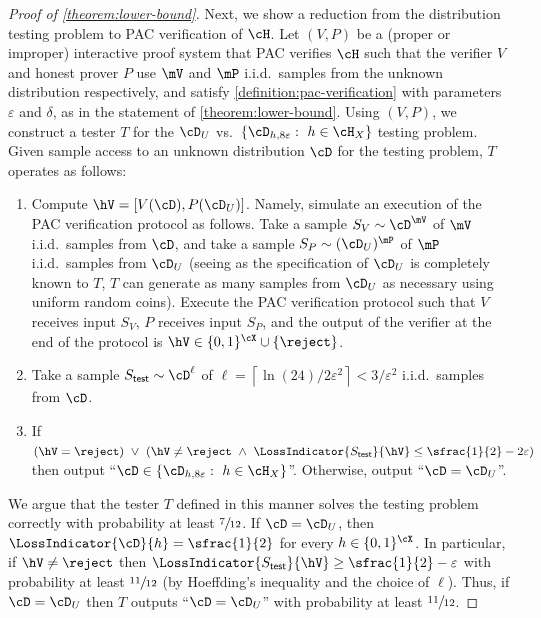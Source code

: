 \documentclass{toc}
\begin{document}
\begin{proof}[Proof of \cref{theorem:lower-bound}]
	Next, we show a reduction from the distribution testing problem to PAC verification of $\cH$. Let $(V,P)$ be a (proper or improper) interactive proof system that PAC verifies $\cH$ such that the verifier $V$ and honest prover $P$ use $\mV$ and $\mP$ i.i.d.\ samples from the unknown distribution respectively, and satisfy \cref{definition:pac-verification} with parameters $\varepsilon$ and $\delta$, as in the statement of \cref{theorem:lower-bound}.
	Using $(V,P)$, we construct a tester $T$ for the $\cD_U$ vs.\ $\{\cD_{h,8\varepsilon}: ~ h \in \cH_X\}$ testing problem. Given sample access to an unknown distribution $\cD$ for the testing problem, $T$ operates as follows:
	\begin{enumerate}
		\item{
			Compute $\hV = [V(\cD),P(\cD_U)]$. Namely, simulate an execution of the PAC verification protocol as follows. Take a sample $S_V \sim \cD^{\mV}$ of $\mV$ i.i.d.\ samples from $\cD$, and take a sample $S_P \sim (\cD_U)^{\mP}$ of $\mP$ i.i.d.\ samples from $\cD_U$ (seeing as the specification of $\cD_U$ is completely known to $T$, $T$ can generate as many samples from $\cD_U$ as necessary using uniform random coins). Execute the PAC verification protocol such that $V$ receives input $S_V$, $P$ receives input $S_P$, and the output of the verifier at the end of the protocol is $\hV \in \{0,1\}^\cX \cup \{\reject\}$.   
		}
		\item{
			Take a sample $S_{\mathsf{test}} \sim \cD^\ell$ of $\ell = \left\lceil \ln(24)/2\varepsilon^2 \right\rceil < 3/\varepsilon^2$ i.i.d.\ samples from $\cD$.
		}
		\item{
			If $(\hV = \reject)  ~ \lor ~ (\hV \neq \reject ~ \land ~ \LossIndicator{S_{\mathsf{test}}}{\hV} \leq \sfrac{1}{2}-2\varepsilon)$ then output ``$\cD \in \{\cD_{h,8\varepsilon} : ~ h \in \cH_X\}$''. Otherwise, output ``$\cD = \cD_U$''. 
		}
	\end{enumerate}
	We argue that the tester $T$ defined in this manner solves the testing problem correctly with probability at least $\sfrac{7}{12}$. If $\cD = \cD_U$, then $\LossIndicator{\cD}{h} = \sfrac{1}{2}$ for every $h \in \{0,1\}^\cX$. In particular, if $\hV \neq \reject$ then $\LossIndicator{S_{\mathsf{test}}}{\hV} \geq \sfrac{1}{2} - \varepsilon$ with probability at least $\sfrac{11}{12}$ (by Hoeffding's inequality and the choice of $\ell$). Thus, if $\cD = \cD_U$ then $T$ outputs ``$\cD = \cD_U$'' with probability at least $\sfrac{11}{12}$. 
	

\end{proof}
\end{document}
